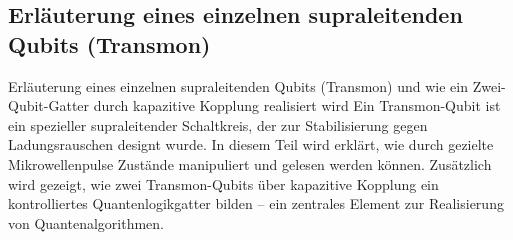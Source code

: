 \subsection{Erläuterung eines einzelnen supraleitenden Qubits (Transmon)}
Erläuterung eines einzelnen supraleitenden Qubits (Transmon) und wie ein Zwei-Qubit-Gatter durch kapazitive Kopplung realisiert wird
Ein Transmon-Qubit ist ein spezieller supraleitender Schaltkreis, der zur Stabilisierung gegen Ladungsrauschen designt wurde. In diesem Teil wird erklärt, wie durch gezielte Mikrowellenpulse Zustände manipuliert und gelesen werden können. Zusätzlich wird gezeigt, wie zwei Transmon-Qubits über kapazitive Kopplung ein kontrolliertes Quantenlogikgatter bilden – ein zentrales Element zur Realisierung von Quantenalgorithmen.

\printbibliography
